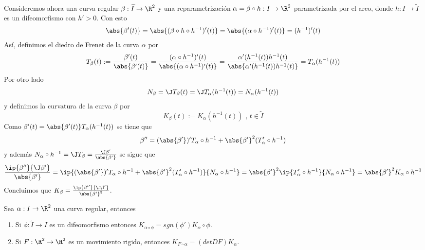 \documentclass{article}
\begin{document}
\noindent Consideremos ahora una curva regular $\beta:\widetilde{I}\to\R^{2}$ y una reparametrización
$\alpha=\beta\circ h: I\to\R^{2}$ parametrizada por el arco, donde $h: I\to\widetilde{I}$ es un
difeomorfismo con $h'>0$. Con esto
\begin{equation*}
    \abs{\beta'(t)}=\abs{(\beta\circ h\circ h^{-1})'(t)}=\abs{(\alpha\circ h^{-1})'(t)}=
    (h^{-1})'(t)
\end{equation*}
Así, definimos el diedro de Frenet de la curva $\alpha$ por
\begin{equation*}
    T_{\beta}(t):=\frac{\beta'(t)}{\abs{\beta'(t)}}=
    \frac{(\alpha\circ h^{-1})'(t)}{\abs{(\alpha\circ h^{-1})'(t)}}=
    \frac{\alpha'(h^{-1}(t))h^{-1}(t)}{\abs{\alpha'(h^{-1}(t))h^{-1}(t)}}=
    T_{\alpha}(h^{-1}(t))
\end{equation*}
Por otro lado
\begin{equation*}
    N_{\beta}=\J T_{\beta}(t)=\J T_{\alpha}(h^{-1}(t))=N_{\alpha}(h^{-1}(t))
\end{equation*}
y definimos la curvatura de la curva $\beta$ por
\begin{equation*}
    K_{\beta}(t):=K_{\alpha}(h^{-1}(t))\text{ , }t\in\widetilde{I}
\end{equation*}
Como $\beta'(t)=\abs{\beta'(t)}T_{\alpha}(h^{-1}(t))$ se tiene que
\begin{equation*}
    \beta''=(\abs{\beta'})'T_{\alpha}\circ h^{-1}+\abs{\beta'}^{2}(T'_{\alpha}\circ h^{-1})
\end{equation*}
y además $N_{\alpha}\circ h^{-1}=\J T_{\beta}=\frac{\J\beta'}{\abs{\beta'}}$ se sigue que
\begin{equation*}
    \frac{\ip{\beta''}{\J\beta'}}{\abs{\beta'}}=
    \ip{(\abs{\beta'})'T_{\alpha}\circ h^{-1}+\abs{\beta'}^{2}(T'_{\alpha}\circ h^{-1})}
    {N_{\alpha}\circ h^{-1}}=\abs{\beta'}^{2}\ip{T'_{\alpha}\circ h^{-1}}{N_{\alpha}\circ h^{-1}}
    =\abs{\beta'}^{2}K_{\alpha}\circ h^{-1}
\end{equation*}
Concluimos que $K_{\beta}=\frac{\ip{\beta''}{\J\beta'}}{\abs{\beta'}^{3}}$.

\begin{prop}
    Sea $\alpha: I\to\R^{2}$ una curva regular, entonces
    \begin{enumerate}
        \item Si $\phi:\widetilde{I}\to I$ es un difeomorfismo entonces $K_{\alpha\circ\phi}=
        sgn(\phi')K_{\alpha}\circ\phi$.
        
        \item Si $F:\R^{2}\to\R^{2}$ es un movimiento rigido, entonces $K_{F\circ\alpha}=
        (detDF)K_{\alpha}$.
    \end{enumerate}
\end{prop}
\end{document}
